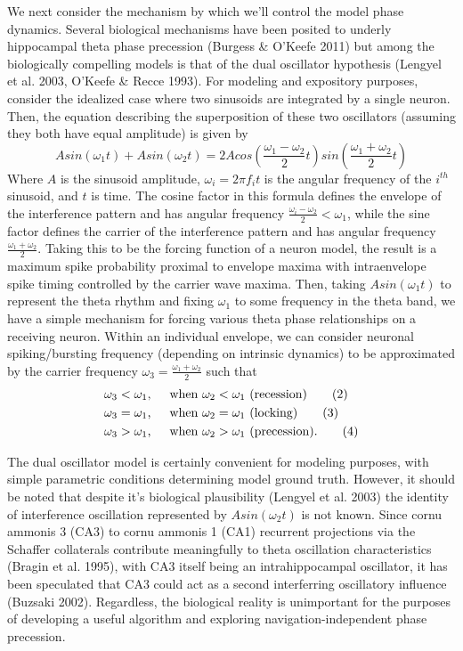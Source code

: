 \documentclass[12pt, letterpaper]{article}
\newenvironment{collapsable}{}{}
\begin{document}
\begin{collapsable}
  \vspace{12pt}

  We next consider the mechanism by which we'll control the model phase dynamics.
  Several biological mechanisms have been posited to underly hippocampal theta
  phase precession (Burgess \& O'Keefe 2011) but among the biologically
  compelling models is that of the dual oscillator hypothesis (Lengyel et al.
  2003, O'Keefe \& Recce 1993). For modeling and expository purposes, consider
  the idealized case where two sinusoids are integrated by a single neuron.
  Then, the equation describing the superposition of these two oscillators
  (assuming they both have equal amplitude) is given by
  \[Asin(\omega_1t)+Asin(\omega_2t)=2Acos\left(\frac{\omega_1-\omega_2}{2}t\right)sin\left(
      \frac{\omega_1+\omega_2}{2}t\right)\tag{1}\]
  Where $A$ is the sinusoid amplitude, $\omega_i=2\pi f_it$ is the angular
  frequency of the $i^{th}$ sinusoid, and $t$ is time. The cosine factor in this
  formula defines the envelope of the interference pattern and has angular
  frequency $\frac{\omega_i-\omega_2}{2}<\omega_1$, while the sine factor
  defines the carrier of the interference pattern and has angular frequency
  $\frac{\omega_1+\omega_2}{2}$. Taking this to be the forcing
  function of a neuron model, the result is a maximum spike probability proximal
  to envelope maxima with intraenvelope spike timing controlled by the carrier
  wave maxima. Then, taking $Asin(\omega_1t)$ to represent the theta
  rhythm and fixing $\omega_1$ to some frequency in the theta band, we have a
  simple mechanism for forcing various theta phase relationships on a receiving
  neuron. Within an individual envelope, we can consider neuronal
  spiking/bursting frequency (depending on intrinsic dynamics) to be
  approximated by the carrier frequency $\omega_3=\frac{\omega_1+\omega_2}{2}$
  such that
  \begin{align*}
    \omega_3&<\omega_1\text{,\indent when $\omega_2<\omega_1$ (recession)}\tag{2}\\
    \omega_3&=\omega_1\text{,\indent when $\omega_2=\omega_1$ (locking)}\tag{3}\\
    \omega_3&>\omega_1\text{,\indent when $\omega_2>\omega_1$ (precession).}\tag{4}
  \end{align*}

  The dual oscillator model is certainly convenient for modeling purposes,
  with simple parametric conditions determining model ground truth. However, it should be
  noted that despite it's biological plausibility (Lengyel et al. 2003) the identity of interference
  oscillation represented by $Asin(\omega_2t)$ is not known. Since cornu ammonis 3 (CA3) to
  cornu ammonis 1 (CA1) recurrent projections via the Schaffer collaterals contribute
  meaningfully to theta oscillation characteristics (Bragin et al. 1995), with CA3 itself being an
  intrahippocampal oscillator, it has been speculated that CA3 could act as a
  second interferring oscillatory influence (Buzsaki 2002). Regardless, the
  biological reality is unimportant for the purposes of developing a useful
  algorithm and exploring navigation-independent phase precession.
\end{collapsable}
\end{document}
